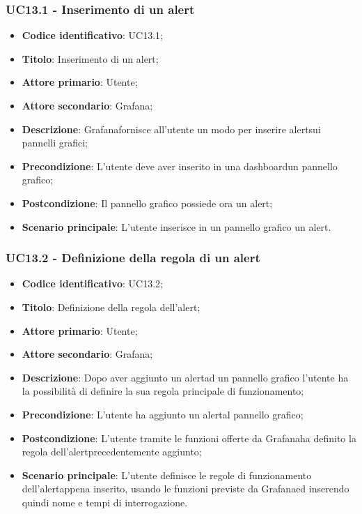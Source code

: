 \subsubsection{UC13.1 - Inserimento di un alert}
\begin{itemize}
	\item \textbf{Codice identificativo}: UC13.1;
	\item \textbf{Titolo}: Inserimento di un alert\glo;
	\item \textbf{Attore primario}: Utente;
	\item \textbf{Attore secondario}: Grafana\glo;
	\item \textbf{Descrizione}: Grafana\glosp fornisce all'utente un modo per inserire alert\glosp sui pannelli grafici;
	\item \textbf{Precondizione}: L'utente deve aver inserito in una dashboard\glosp un pannello grafico;
	\item \textbf{Postcondizione}: Il pannello grafico possiede ora un alert\glo;
	\item \textbf{Scenario principale}: L'utente inserisce in un pannello grafico un alert\glo.
\end{itemize}

\subsubsection{UC13.2 - Definizione della regola di un alert}
\begin{itemize}
	\item \textbf{Codice identificativo}: UC13.2;
	\item \textbf{Titolo}: Definizione della regola dell'alert\glo;
	\item \textbf{Attore primario}: Utente;
	\item \textbf{Attore secondario}: Grafana\glo;
	\item \textbf{Descrizione}: Dopo aver aggiunto un alert\glosp ad un pannello grafico l'utente ha la possibilità di definire la sua regola principale di funzionamento;
	\item \textbf{Precondizione}: L'utente ha aggiunto un alert\glosp al pannello grafico;
	\item \textbf{Postcondizione}: L'utente tramite le funzioni offerte da Grafana\glosp ha definito la regola dell'alert\glosp precedentemente aggiunto;
	\item \textbf{Scenario principale}: L'utente definisce le regole di funzionamento dell'alert\glosp appena inserito, usando le funzioni previste da Grafana\glosp ed inserendo quindi nome e tempi di interrogazione.
\end{itemize}

